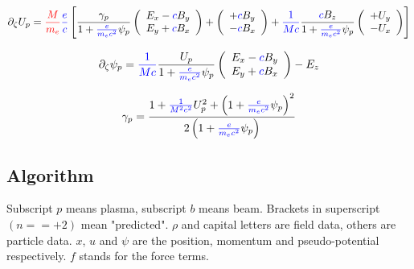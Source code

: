 \documentclass{article}
\begin{document}
\begin{equation}
\partial_{\zeta}U_p =
\textcolor{red}{\frac{M}{m_e}}
\textcolor{blue}{\frac{e}{c}}
\left[
\frac{\gamma_p}{1+\textcolor{blue}{\frac{e}{m_ec^2}}\psi_p}
\left(
\begin{array}{l}
   E_x - \textcolor{blue}{c}B_y \\
   E_y + \textcolor{blue}{c}B_x
\end{array}
\right)
+
\left(
\begin{array}{l}
   +\textcolor{blue}{c}B_y \\
   -\textcolor{blue}{c}B_x
\end{array}
\right)
+
\textcolor{blue}{\frac{1}{Mc}}
\frac{\textcolor{blue}{c}B_z}{1+\textcolor{blue}{\frac{e}{m_ec^2}}\psi_p}
\left(
\begin{array}{l}
   +U_y \\
   -U_x
\end{array}
\right)
\right]
\end{equation}

\begin{equation}
\partial_{\zeta}\psi_p =
\textcolor{blue}{\frac{1}{Mc}}
\frac{U_p}{1+\textcolor{blue}{\frac{e}{m_ec^2}}\psi_p}
\left(
\begin{array}{l}
   E_x - \textcolor{blue}{c}B_y \\
   E_y + \textcolor{blue}{c}B_x
\end{array}
\right)
-
E_z
\end{equation}

\begin{equation}
\gamma_p = \frac{1 + \textcolor{blue}{\frac{1}{M^2c^2}}U_p^2 + \left( 1+\textcolor{blue}{\frac{e}{m_ec^2}} \psi_p \right)^2}
                {2\left(1+\textcolor{blue}{\frac{e}{m_ec^2}}\psi_p\right)}
\end{equation}

\pagebreak

\subsection*{Algorithm}

Subscript $p$ means plasma, subscript $b$ means beam. Brackets in superscript $(n==+2)$ mean "predicted". $\rho$ and capital letters are field data, others are particle data. $x$, $u$ and $\psi$ are the position, momentum and pseudo-potential respectively. $f$ stands for the force terms.
\end{document}
